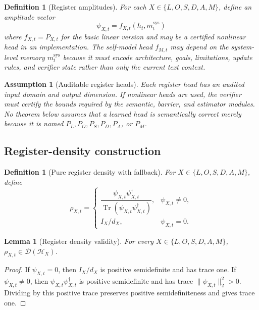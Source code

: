 \documentclass[11pt,a4paper]{article}
\newtheorem{lemma}[theorem]{Lemma}
\newtheorem{definition}[theorem]{Definition}
\newtheorem{assumption}[theorem]{Assumption}
\newcommand{\D}{\mathcal D}
\newcommand{\Hcal}{\mathcal H}
\newcommand{\Tr}{\operatorname{Tr}}
\newcommand{\sys}{\mathrm{sys}}
\begin{document}
\begin{definition}[Register amplitudes]
For each \(X\in\{L,O,S,D,A,M\}\), define an amplitude vector
\[
\psi_{X,t}=f_{X,t}(h_t,m_t^{\sys})
\]
where \(f_{X,t}=P_{X,t}\) for the basic linear version and may be a certified nonlinear head in an implementation.  The self-model head \(f_{M,t}\) may depend on the system-level memory \(m_t^{\sys}\) because it must encode architecture, goals, limitations, update rules, and verifier state rather than only the current text context.
\end{definition}

\begin{assumption}[Auditable register heads]
Each register head has an audited input domain and output dimension.  If nonlinear heads are used, the verifier must certify the bounds required by the semantic, barrier, and estimator modules.  No theorem below assumes that a learned head is semantically correct merely because it is named \(P_L,P_O,P_S,P_D,P_A\), or \(P_M\).
\end{assumption}

\subsection{Register-density construction}

\begin{definition}[Pure register density with fallback]
For \(X\in\{L,O,S,D,A,M\}\), define
\[
\rho_{X,t}=
\begin{cases}
\dfrac{\psi_{X,t}\psi_{X,t}^{\dagger}}{\Tr(\psi_{X,t}\psi_{X,t}^{\dagger})},& \psi_{X,t}\neq0,\\[1.1em]
I_X/d_X,& \psi_{X,t}=0.
\end{cases}
\]
\end{definition}

\begin{lemma}[Register density validity]
\label{lem:register-density-validity}
For every \(X\in\{L,O,S,D,A,M\}\), \(\rho_{X,t}\in\D(\Hcal_X)\).
\end{lemma}

\begin{proof}
If \(\psi_{X,t}=0\), then \(I_X/d_X\) is positive semidefinite and has trace one.  If \(\psi_{X,t}\neq0\), then \(\psi_{X,t}\psi_{X,t}^{\dagger}\) is positive semidefinite and has trace \(\|\psi_{X,t}\|_2^2>0\).  Dividing by this positive trace preserves positive semidefiniteness and gives trace one.
\end{proof}
\end{document}
